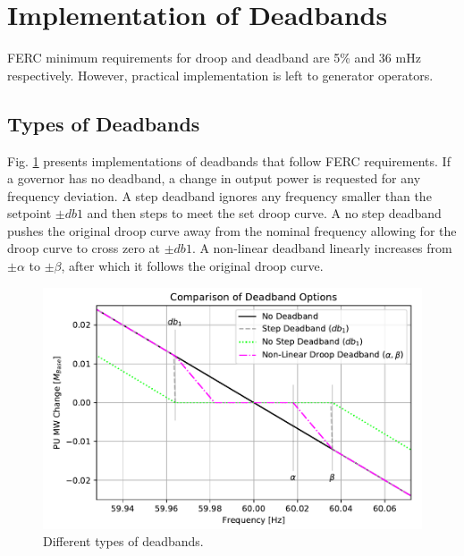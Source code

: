 \section{Implementation of Deadbands}
FERC minimum requirements for droop and deadband are 5\% and 36 mHz respectively\cite{ferc2018}.
However, practical implementation is left to generator operators.

\subsection{Types of Deadbands}
Fig. \ref{fig: deadbandType} presents implementations of deadbands that follow FERC requirements.
If a governor has no deadband, a change in output power is requested for any frequency deviation.
A step deadband ignores any frequency smaller than the setpoint $\pm db1$ and then steps to meet the set droop curve.
A no step deadband pushes the original droop curve away from the nominal frequency allowing for the droop curve to cross zero at $\pm db1$.
A non-linear deadband linearly increases from $\pm \alpha$ to $\pm \beta$, after which it follows the original droop curve.
\begin{figure}[!ht]
	\centering
	\includegraphics[width=\linewidth]{figures/dbAction3}
	\caption{Different types of deadbands.}
	\label{fig: deadbandType}
\end{figure}